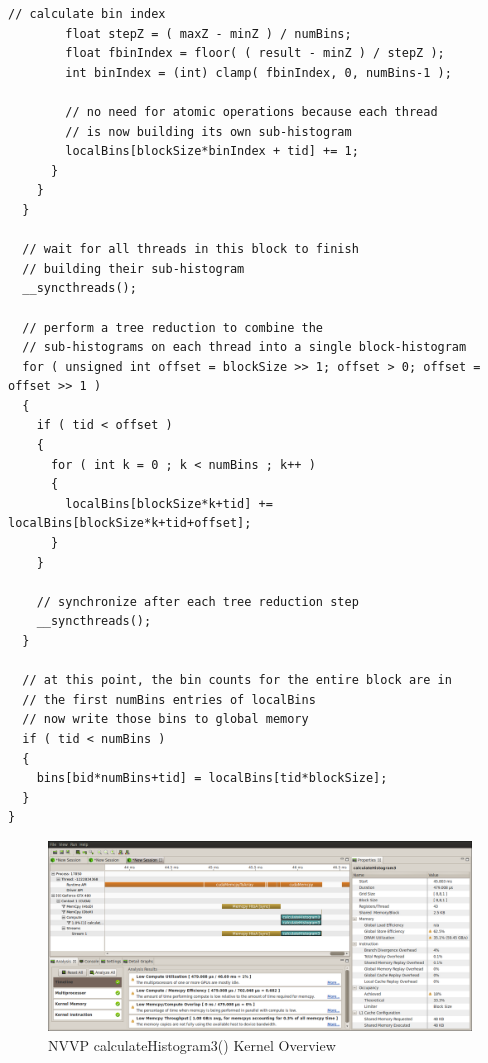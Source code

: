 \documentclass{article}
\begin{document}
\begin{lstlisting}[caption={calculateHistogram3: Per-Thread Sub-Histograms},label={kernel3}]
        // calculate bin index
        float stepZ = ( maxZ - minZ ) / numBins;
        float fbinIndex = floor( ( result - minZ ) / stepZ );
        int binIndex = (int) clamp( fbinIndex, 0, numBins-1 );

        // no need for atomic operations because each thread
        // is now building its own sub-histogram
        localBins[blockSize*binIndex + tid] += 1;
      }
    }
  }

  // wait for all threads in this block to finish
  // building their sub-histogram
  __syncthreads();

  // perform a tree reduction to combine the
  // sub-histograms on each thread into a single block-histogram
  for ( unsigned int offset = blockSize >> 1; offset > 0; offset = offset >> 1 )
  {
    if ( tid < offset )
    {
      for ( int k = 0 ; k < numBins ; k++ )
      {
        localBins[blockSize*k+tid] += localBins[blockSize*k+tid+offset];
      }
    }

    // synchronize after each tree reduction step
    __syncthreads();
  }

  // at this point, the bin counts for the entire block are in
  // the first numBins entries of localBins
  // now write those bins to global memory
  if ( tid < numBins )
  {
    bins[bid*numBins+tid] = localBins[tid*blockSize];
  }
}
\end{lstlisting}

\begin{figure}
\centering
\includegraphics[width=1.0\textwidth]{screenshots/nvvp/calculateHistogram3_screen3.png}
\caption{NVVP calculateHistogram3() Kernel Overview}
\label{kernel3nvvp3}
\end{figure}
\end{document}
